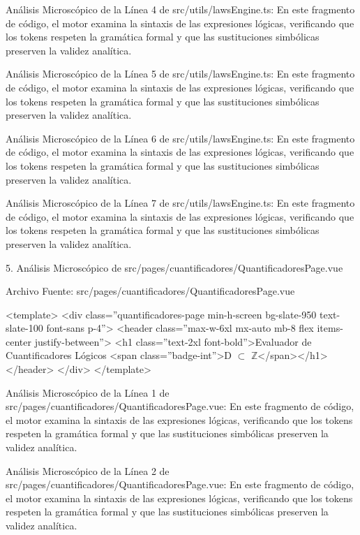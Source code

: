 \documentclass[11pt,a4paper]{article}
\begin{document}
Análisis Microscópico de la Línea 4 de src/utils/lawsEngine.ts: En este
fragmento de código, el motor examina la sintaxis de las expresiones
lógicas, verificando que los tokens respeten la gramática formal y que
las sustituciones simbólicas preserven la validez analítica.

Análisis Microscópico de la Línea 5 de src/utils/lawsEngine.ts: En este
fragmento de código, el motor examina la sintaxis de las expresiones
lógicas, verificando que los tokens respeten la gramática formal y que
las sustituciones simbólicas preserven la validez analítica.

Análisis Microscópico de la Línea 6 de src/utils/lawsEngine.ts: En este
fragmento de código, el motor examina la sintaxis de las expresiones
lógicas, verificando que los tokens respeten la gramática formal y que
las sustituciones simbólicas preserven la validez analítica.

Análisis Microscópico de la Línea 7 de src/utils/lawsEngine.ts: En este
fragmento de código, el motor examina la sintaxis de las expresiones
lógicas, verificando que los tokens respeten la gramática formal y que
las sustituciones simbólicas preserven la validez analítica.

5. Análisis Microscópico de src/pages/cuantificadores/QuantificadoresPage.vue

 Archivo Fuente: src/pages/cuantificadores/QuantificadoresPage.vue

\medskip\hrulefill\medskip
<template>
<div class=''quantificadores-page min-h-screen bg-slate-950
text-slate-100 font-sans p-4''>
<header class=''max-w-6xl mx-auto mb-8 flex items-center
justify-between''>
<h1 class=''text-2xl font-bold''>Evaluador de Cuantificadores Lógicos
<span class=''badge-int''>D $ \subset $ $\mathbb{Z}$</span></h1>
</header>
</div>
</template>
\medskip\hrulefill\medskip

\medskip\hrulefill\medskip

Análisis Microscópico de la Línea 1 de
src/pages/cuantificadores/QuantificadoresPage.vue: En este fragmento de
código, el motor examina la sintaxis de las expresiones lógicas,
verificando que los tokens respeten la gramática formal y que las
sustituciones simbólicas preserven la validez analítica.

Análisis Microscópico de la Línea 2 de
src/pages/cuantificadores/QuantificadoresPage.vue: En este fragmento de
código, el motor examina la sintaxis de las expresiones lógicas,
verificando que los tokens respeten la gramática formal y que las
sustituciones simbólicas preserven la validez analítica.
\end{document}

